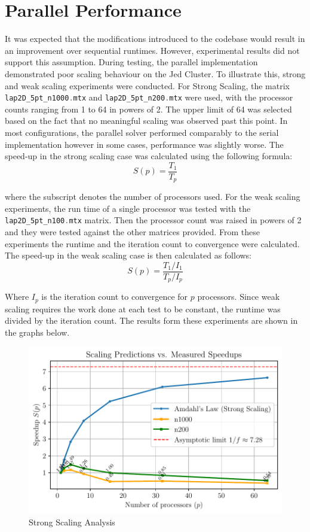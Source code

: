 \section{Parallel Performance}
It was expected that the modifications introduced to the codebase would result in an improvement over sequential
runtimes. However, experimental results did not support this assumption. During testing, the parallel implementation
demonstrated poor scaling behaviour on the Jed Cluster. To illustrate this, strong and weak scaling experiments were
conducted. For Strong Scaling, the matrix \lstinline[language=C]|lap2D_5pt_n1000.mtx| and \lstinline[language=C]|lap2D_5pt_n200.mtx| were used, with the processor
counts ranging from 1 to 64 in powers of 2. The upper limit of 64 was selected based on the fact that no meaningful
scaling was observed past this point. In most configurations, the parallel solver performed comparably to the serial
implementation however in some cases, performance was slightly worse. The speed-up in the strong scaling case was
calculated using the following formula:
\begin{equation*}
    S(p) = \frac{T_1}{T_p}
\end{equation*}

where the subscript denotes the number of processors used. For the weak scaling experiments, the run time of a single
processor was tested with the \lstinline[language=C]|lap2D_5pt_n100.mtx| matrix. Then the processor count was raised
in powers of 2 and they were tested against the other matrices provided. From these experiments the runtime and the
iteration count to convergence were calculated. The speed-up in the weak scaling case is then calculated as follows:
\begin{equation*}
    S(p) = \frac{T_1 / I_1}{T_p / I_p}    
\end{equation*}

Where $I_{p}$ is the iteration count to convergence for $p$ processors. Since weak scaling requires the work done at
each test to be constant, the runtime was divided by the iteration count. The results form these experiments are shown
in the graphs below.

\begin{figure}[h!]
    \centering
    \includegraphics[width=\textwidth]{plots/strong_scaling.pdf}
    \caption{Strong Scaling Analysis}
    \label{fig:StrongScaling}
\end{figure}
\FloatBarrier

